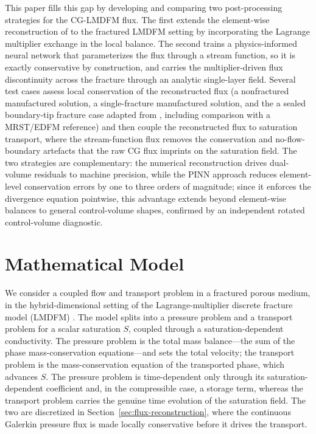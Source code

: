 \documentclass[a4paper,fleqn]{cas-sc}
\begin{document}
This paper fills this gap by developing and comparing two post-processing strategies for the CG-LMDFM
flux. The first extends the element-wise reconstruction of \citet{DENG2019166} to the fractured LMDFM
setting by incorporating the Lagrange multiplier exchange in the local balance. The second trains a
physics-informed neural network that parameterizes the flux through a stream function, so it is exactly
conservative by construction, and carries the multiplier-driven flux discontinuity across the fracture
through an analytic single-layer field. Several test cases assess local conservation of the reconstructed
flux (a nonfractured manufactured solution, a single-fracture manufactured solution, and the
a sealed boundary-tip fracture case adapted from \citet{Koeppel2019}, including comparison with a MRST/EDFM
reference) and then couple the reconstructed flux to saturation transport, where the stream-function flux
removes the conservation and no-flow-boundary artefacts that the raw CG flux imprints on the saturation
field.
The two strategies are complementary: the numerical reconstruction drives dual-volume residuals to machine
precision, while the PINN approach reduces element-level conservation errors by one to three orders of magnitude;
since it enforces the divergence equation pointwise, this advantage extends beyond element-wise balances
to general control-volume shapes, confirmed by an independent rotated control-volume diagnostic.


\section{Mathematical Model}
\label{sec:model-diagnostics}

We consider a coupled flow and transport problem in a fractured porous medium, in
the hybrid-dimensional setting of the Lagrange-multiplier discrete fracture model
(LMDFM) \citep{Koeppel2019}. The model splits into a pressure problem and a
transport problem for a scalar saturation \(S\), coupled through a
saturation-dependent conductivity. The pressure problem is the total mass
balance---the sum of the phase mass-conservation equations---and sets the total
velocity; the transport problem is the mass-conservation equation of the
transported phase, which advances \(S\). The pressure problem is time-dependent
only through its saturation-dependent coefficient and, in the compressible case,
a storage term, whereas the transport problem carries the genuine time evolution
of the saturation field.
The two are discretized in Section~\ref{sec:flux-reconstruction}, where the
continuous
Galerkin pressure flux is made locally conservative before it drives the
transport.
\end{document}
